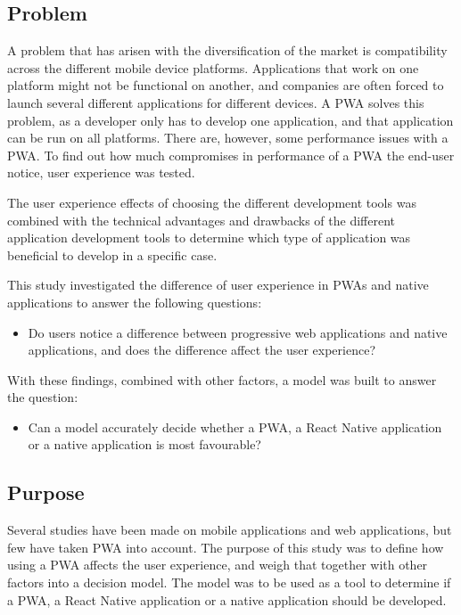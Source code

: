 \subsection{Problem}
A problem that has arisen with the diversification of the market is compatibility across the different mobile device platforms. Applications that work on one platform might not be functional on another, and companies are often forced to launch several different applications for different devices. 
A PWA solves this problem, as a developer only has to develop one application, and that application can be run on all platforms. There are, however, some performance issues with a PWA. 
To find out how much compromises in performance of a PWA the end-user notice, user experience was tested.

The user experience effects of choosing the different development tools was combined with the technical advantages and drawbacks of the different application development tools to determine which type of application was beneficial to develop in a specific case.

This study investigated the difference of user experience in PWAs and native applications to answer the following questions:

\begin{itemize}
    \item Do users notice a difference between progressive web applications and native applications, and does the difference affect the user experience?
\end{itemize}

With these findings, combined with other factors, a model was built to answer the question:

\begin{itemize}
    \item Can a model accurately decide whether a PWA, a React Native application or a native application is most favourable?
\end{itemize}

\subsection{Purpose}

Several studies have been made on mobile applications and web applications, but few have taken PWA into account.
The purpose of this study was to define how using a PWA affects the user experience, and weigh that together with other factors into a decision model. The model was to be used as a tool to determine if a PWA, a React Native application or a native application should be developed.

